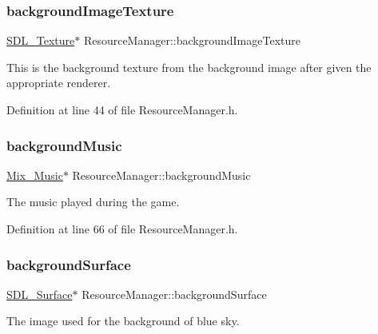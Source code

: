 \subsubsection{\texorpdfstring{backgroundImageTexture}{backgroundImageTexture}}
{\footnotesize\ttfamily \mbox{\hyperlink{_s_d_l__render_8h_a17850d7f1f5de457727cb3cf66b3a7f5}{S\+D\+L\+\_\+\+Texture}}$\ast$ Resource\+Manager\+::background\+Image\+Texture}



This is the background texture from the background image after given the appropriate renderer. 



Definition at line 44 of file Resource\+Manager.\+h.

\mbox{\label{class_resource_manager_a0ff25c7a84100edb4f62a24cd0226149}} 
\subsubsection{\texorpdfstring{backgroundMusic}{backgroundMusic}}
{\footnotesize\ttfamily \mbox{\hyperlink{_s_d_l__mixer_8h_a1d58ae8fa29e1c03df23baeffb32b14c}{Mix\+\_\+\+Music}}$\ast$ Resource\+Manager\+::background\+Music}



The music played during the game. 



Definition at line 66 of file Resource\+Manager.\+h.

\mbox{\label{class_resource_manager_a824fd3c239a6ecca4b1cf770c73c1d3a}} 
\subsubsection{\texorpdfstring{backgroundSurface}{backgroundSurface}}
{\footnotesize\ttfamily \mbox{\hyperlink{struct_s_d_l___surface}{S\+D\+L\+\_\+\+Surface}}$\ast$ Resource\+Manager\+::background\+Surface}



The image used for the background of blue sky. 



